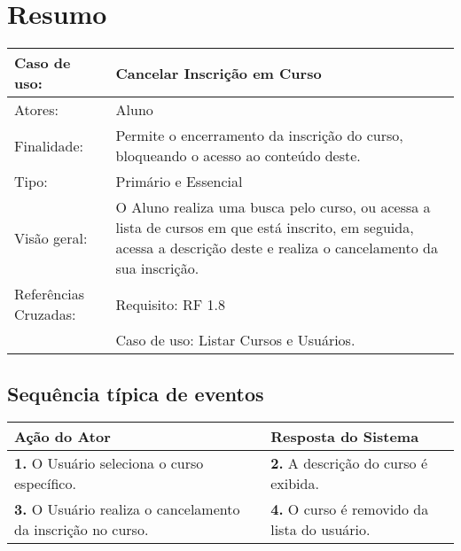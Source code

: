 \documentclass[12pt,a4paper,onecolumn,titlepage]{article}
\begin{document}
\section{Resumo}
\begin{table}[h!]
\begin{center}
\begin{tabular}{p{2.5cm} p{9.5cm}}
Caso de uso: & \textbf{Cancelar Inscrição em Curso} \\ \hline
Atores: & Aluno \\ \hline
Finalidade: & Permite o encerramento da inscrição do curso, bloqueando o acesso ao conteúdo deste. \\ \hline
Tipo: & Primário e Essencial\\ \hline
Visão geral: & O Aluno realiza uma busca pelo curso, ou acessa a lista de cursos em que está inscrito, em seguida, acessa a descrição deste e realiza o cancelamento da sua inscrição. \\ \hline
Referências Cruzadas: & Requisito: RF 1.8 \\ & Caso de uso: Listar Cursos e Usuários.
\end{tabular}
\end{center}
\end{table}

\subsection{Sequência típica de eventos}
\begin{center}
\def\arraystretch{1.1}
\begin{tabular}{|p{6cm}|p{6cm}|}

\hline
\textbf{Ação do Ator} & \textbf{Resposta do Sistema} \\ \hline
\textbf{1.} O Usuário seleciona o curso específico. & \textbf{2.} A descrição do curso é exibida. \\ \hline
\textbf{3.} O Usuário realiza o cancelamento da inscrição no curso. & \textbf{4.} O curso é removido da lista do usuário. \\ \hline
\end{tabular}
\end{center}


\newpage


\end{document}
